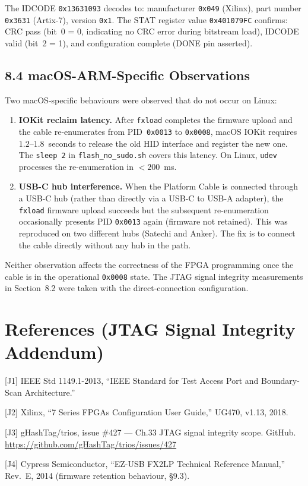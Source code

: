 The IDCODE \texttt{0x13631093} decodes to: manufacturer
\texttt{0x049} (Xilinx), part number \texttt{0x3631}
(Artix-7), version \texttt{0x1}. The STAT register
value \texttt{0x401079FC} confirms: CRC pass
(bit~0 = 0, indicating no CRC error during
bitstream load), IDCODE valid (bit~2 = 1), and
configuration complete (DONE pin asserted).

\subsection{8.4 macOS-ARM-Specific
Observations}\label{fa_33:macos-arm-observations}

Two macOS-specific behaviours were observed that do
not occur on Linux:

\begin{enumerate}
\item \textbf{IOKit reclaim latency.} After
\texttt{fxload} completes the firmware upload and
the cable re-enumerates from PID~\texttt{0x0013} to
\texttt{0x0008}, macOS IOKit requires
$1.2$--$1.8$~seconds to release the old HID
interface and register the new one. The
\texttt{sleep\,2} in \texttt{flash\_no\_sudo.sh}
covers this latency. On Linux, \texttt{udev}
processes the re-enumeration in $< 200$~ms.

\item \textbf{USB-C hub interference.} When the
Platform Cable is connected through a USB-C hub
(rather than directly via a USB-C to USB-A adapter),
the \texttt{fxload} firmware upload succeeds but the
subsequent re-enumeration occasionally presents PID
\texttt{0x0013} again (firmware not retained). This
was reproduced on two different hubs (Satechi and
Anker). The fix is to connect the cable directly
without any hub in the path.
\end{enumerate}

Neither observation affects the correctness of the
FPGA programming once the cable is in the
operational \texttt{0x0008} state. The JTAG signal
integrity measurements in Section~8.2 were taken
with the direct-connection configuration.

\section{References (JTAG Signal Integrity
Addendum)}\label{fa_33:references-jtag-si}

[J1] IEEE Std 1149.1-2013, ``IEEE Standard for
Test Access Port and Boundary-Scan Architecture.''

[J2] Xilinx, ``7 Series FPGAs Configuration User
Guide,'' UG470, v1.13, 2018.

[J3] gHashTag/trios, issue \#427 --- Ch.33
JTAG signal integrity scope. GitHub.
\url{https://github.com/gHashTag/trios/issues/427}

[J4] Cypress Semiconductor, ``EZ-USB FX2LP
Technical Reference Manual,'' Rev.~E, 2014
(firmware retention behaviour, \S9.3).

